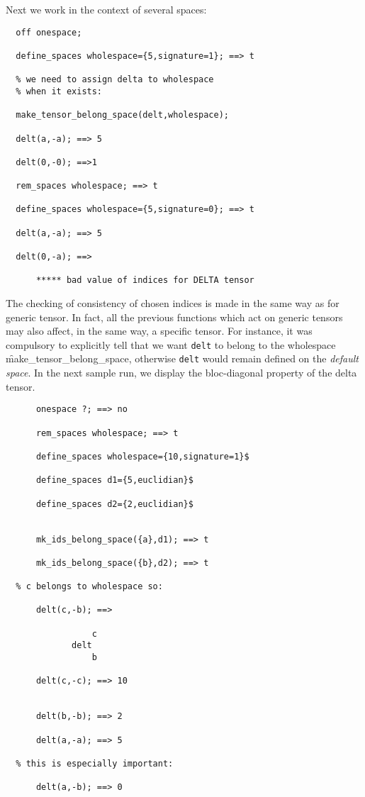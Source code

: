 Next we work in the context of several spaces:
\begin{verbatim}
  off onespace;

  define_spaces wholespace={5,signature=1}; ==> t

  % we need to assign delta to wholespace
  % when it exists:

  make_tensor_belong_space(delt,wholespace);

  delt(a,-a); ==> 5

  delt(0,-0); ==>1

  rem_spaces wholespace; ==> t

  define_spaces wholespace={5,signature=0}; ==> t

  delt(a,-a); ==> 5

  delt(0,-a); ==>

      ***** bad value of indices for DELTA tensor
\end{verbatim}
The checking of consistency of chosen indices is made in the same way as for
generic tensor. In fact, all the previous functions which act on generic tensors
may also affect, in the same way, a specific tensor. For instance, it was
compulsory to explicitly tell that we want \texttt{delt} to belong to the
wholespace \f{make\_tensor\_belong\_space}, otherwise
\texttt{delt} would remain defined on the \emph{default space}.
In the next sample run,  we display the bloc-diagonal property of
the  delta tensor.
\begin{verbatim}
      onespace ?; ==> no

      rem_spaces wholespace; ==> t

      define_spaces wholespace={10,signature=1}$

      define_spaces d1={5,euclidian}$

      define_spaces d2={2,euclidian}$


      mk_ids_belong_space({a},d1); ==> t

      mk_ids_belong_space({b},d2); ==> t

  % c belongs to wholespace so:

      delt(c,-b); ==>

                 c
             delt
                 b

      delt(c,-c); ==> 10


      delt(b,-b); ==> 2

      delt(a,-a); ==> 5

  % this is especially important:

      delt(a,-b); ==> 0
\end{verbatim}
